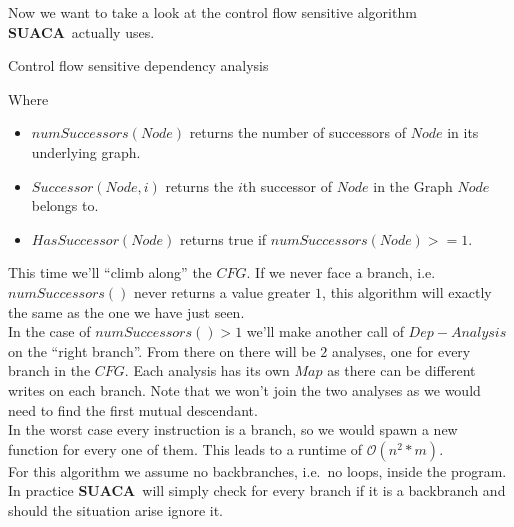\documentclass[a4paper,12pt,titlepage, twoside]{report}
\newcommand{\suaca}{\textbf{SUACA}}
\begin{document}
Now we want to take a look at the control flow sensitive algorithm \suaca\ actually uses. 

\begin{algorithm}[H]
    \SetAlgoLined
    \caption{Control flow sensitive dependency analysis}
    \label{alg:dep}
\end{algorithm}

Where
\begin{itemize}
    \item $numSuccessors(Node)$ returns the number of successors of $Node$ in its underlying graph.
    \item $Successor(Node, i)$ returns the $i$th successor of $Node$ in the Graph $Node$ belongs to.
    \item $HasSuccessor(Node)$ returns true if $numSuccessors(Node) >= 1$.
\end{itemize}

This time we'll ``climb along'' the $CFG$. If we never face a branch, i.e.\ $numSuccessors()$ never returns a value greater $1$, this algorithm will exactly the same as the one we have just seen.\\
In the case of $numSuccessors() > 1$ we'll make another call of $Dep-Analysis$ on the ``right branch''. From there on there will be $2$ analyses, one for every branch in the $CFG$. Each analysis has its own $Map$ as there can be different writes on each branch. Note that we won't join the two analyses as we would need to find the first mutual descendant.\\
In the worst case every instruction is a branch, so we would spawn a new function for every one of them. This leads to a runtime of $\mathcal{O}(n^2*m)$.\\
For this algorithm we assume no backbranches, i.e.\ no loops, inside the program. In practice \suaca\ will simply check for every branch if it is a backbranch and should the situation arise ignore it.
\end{document}
